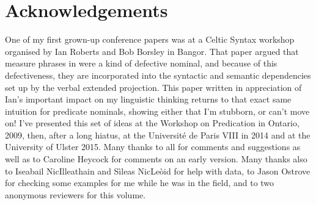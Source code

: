 \documentclass[output=paper]{langsci/langscibook}
\begin{document}
\printchapterglossary{}

\section*{Acknowledgements}

One of my first grown-up conference papers was at a Celtic Syntax workshop
organised by Ian Roberts and Bob Borsley in Bangor. That paper argued that
measure phrases in  were a kind of defective nominal, and
because of this defectiveness, they are incorporated into the syntactic and
semantic dependencies set up by the verbal extended projection. This paper
written in appreciation of Ian's important impact on my linguistic thinking
returns to that exact same intuition for predicate nominals, showing either
that I'm stubborn, or can't move on! I've presented this set of ideas at the
Workshop on Predication in Ontario, 2009,  then, after a long hiatus, at the
Universit\'e de Paris VIII in 2014 and at the University of Ulster 2015. Many
thanks to all for comments and suggestions as well as to Caroline Heycock for
comments on an early version. Many thanks also to Iseabail NicIlleathain and
S\`ileas NicLe\`oid for help with data, to Jason Ostrove for checking some
examples for me while he was in the field, and to two anonymous reviewers for
this volume.

{\sloppy
\printbibliography[heading=subbibliography,notkeyword=this]
}
\end{document}
